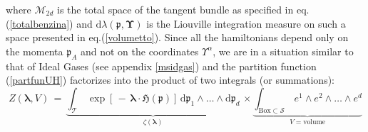 \documentclass[10pt,a4paper]{article}
\begin{document}
 where $\mathcal{M}_{2d}$ is the total space of the tangent bundle as specified in eq.(\ref{totalbenzina}) and
 $\mathrm{d}\lambda(\boldsymbol{\mathfrak{p}},\boldsymbol{\Upsilon}) $ is the Liouville integration measure on such a space
 presented in eq.(\ref{volumetto}). Since all the hamiltonians depend only on the momenta $\mathfrak{p}_A$ and not on the coordinates
 $\Upsilon^\alpha$, we are in a situation similar to that of Ideal Gases (see appendix \ref{msidgas}) and the partition function (\ref{partfunUH}) factorizes into the product of two integrals (or summations):
 \begin{equation}\label{fattorino}
   Z(\boldsymbol{\lambda},V) \, = \, \underbrace{\int_{\mathcal{T}} \,\exp\left[\, -\, \boldsymbol{\lambda} \cdot \boldsymbol{\mathfrak{H}}\left(
   \boldsymbol{\mathfrak{p}}\right)\right] \, \mathrm{d}\mathfrak{p}_1 \wedge \dots \wedge \mathrm{d}\mathfrak{p}_d }_{\zeta(\boldsymbol{\lambda})}\,\times \underbrace{\int_{\text{Box}\subset \mathcal{S}} \, e^1\wedge e^2 \wedge \dots \wedge e^d}_{V=\text{volume}}
 \end{equation}
\end{document}
